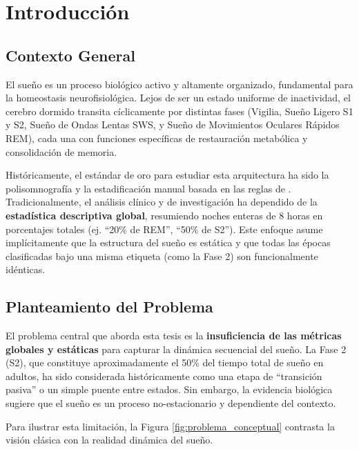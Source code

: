 \chapter{Introducción}
\label{intro}

\section{Contexto General}

El sueño es un proceso biológico activo y altamente organizado, fundamental para la homeostasis neurofisiológica. Lejos de ser un estado uniforme de inactividad, el cerebro dormido transita cíclicamente por distintas fases (Vigilia, Sueño Ligero S1 y S2, Sueño de Ondas Lentas SWS, y Sueño de Movimientos Oculares Rápidos REM), cada una con funciones específicas de restauración metabólica y consolidación de memoria.

Históricamente, el estándar de oro para estudiar esta arquitectura ha sido la polisomnografía y la estadificación manual basada en las reglas de \cite{rechtschaffen1968manual}. Tradicionalmente, el análisis clínico y de investigación ha dependido de la \textbf{estadística descriptiva global}, resumiendo noches enteras de 8 horas en porcentajes totales (ej. ``20\% de REM'', ``50\% de S2''). Este enfoque asume implícitamente que la estructura del sueño es estática y que todas las épocas clasificadas bajo una misma etiqueta (como la Fase 2) son funcionalmente idénticas.

\section{Planteamiento del Problema}

El problema central que aborda esta tesis es la \textbf{insuficiencia de las métricas globales y estáticas} para capturar la dinámica secuencial del sueño.
La Fase 2 (S2), que constituye aproximadamente el 50\% del tiempo total de sueño en adultos, ha sido considerada históricamente como una etapa de ``transición pasiva'' o un simple puente entre estados. Sin embargo, la evidencia biológica sugiere que el sueño es un proceso no-estacionario y dependiente del contexto.

Para ilustrar esta limitación, la Figura \ref{fig:problema_conceptual} contrasta la visión clásica con la realidad dinámica del sueño.


